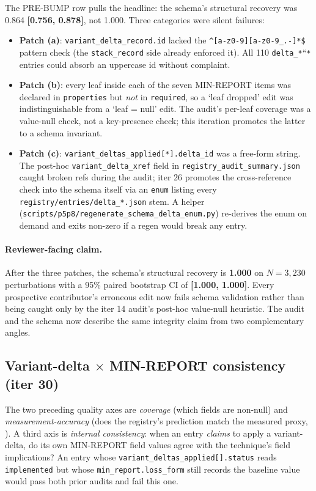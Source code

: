 The PRE-BUMP row pulls the headline: the schema's structural
recovery was 0.864 \textbf{[0.756, 0.878]}, not 1.000. Three
categories were silent failures:

\begin{itemize}
\item \textbf{Patch (a)}: \texttt{variant\_delta\_record.id} lacked
the \verb|^[a-z0-9][a-z0-9_.-]*$| pattern check (the
\texttt{stack\_record} side already enforced it). All 110
\texttt{delta\_*}``\texttt{*} entries could absorb an uppercase id
without complaint.
\item \textbf{Patch (b)}: every leaf inside each of the seven
MIN-REPORT items was declared in \texttt{properties} but \emph{not} in
\texttt{required}, so a `leaf dropped' edit was indistinguishable from
a `leaf = null' edit. The audit's per-leaf coverage was a value-null
check, not a key-presence check; this iteration promotes the latter to a
schema invariant.
\item \textbf{Patch (c)}:
\texttt{variant\_deltas\_applied[*].delta\_id} was a free-form string.
The post-hoc \texttt{variant\_delta\_xref} field in
\texttt{registry\_audit\_summary.json} caught broken refs during the
audit; iter 26 promotes the cross-reference check into the schema
itself via an \texttt{enum} listing every
\texttt{registry/entries/delta\_*.json} stem. A helper
(\texttt{scripts/p5p8/regenerate\_schema\_delta\_enum.py}) re-derives
the enum on demand and exits non-zero if a regen would break any entry.
\end{itemize}

\paragraph{Reviewer-facing claim.} After the three patches, the
schema's structural recovery is \textbf{1.000} on $N=3{,}230$
perturbations with a 95\% paired bootstrap CI of \textbf{[1.000, 1.000]}.
Every prospective contributor's erroneous edit now fails schema
validation rather than being caught only by the iter 14 audit's
post-hoc value-null heuristic. The audit and the schema now describe
the same integrity claim from two complementary angles.

\subsection{Variant-delta \texorpdfstring{$\times$}{x} MIN-REPORT consistency (iter 30)}
\label{sec:p6-delta-consistency}

The two preceding quality axes are \emph{coverage} (which fields are
non-null) and \emph{measurement-accuracy} (does the registry's
prediction match the measured proxy, ).
A third axis is \emph{internal consistency}: when an entry
\emph{claims} to apply a variant-delta, do its own MIN-REPORT field
values agree with the technique's field implications? An entry whose
\texttt{variant\_deltas\_applied[].status} reads \texttt{implemented}
but whose \texttt{min\_report.loss\_form} still records the baseline
value would pass both prior audits and fail this one.

